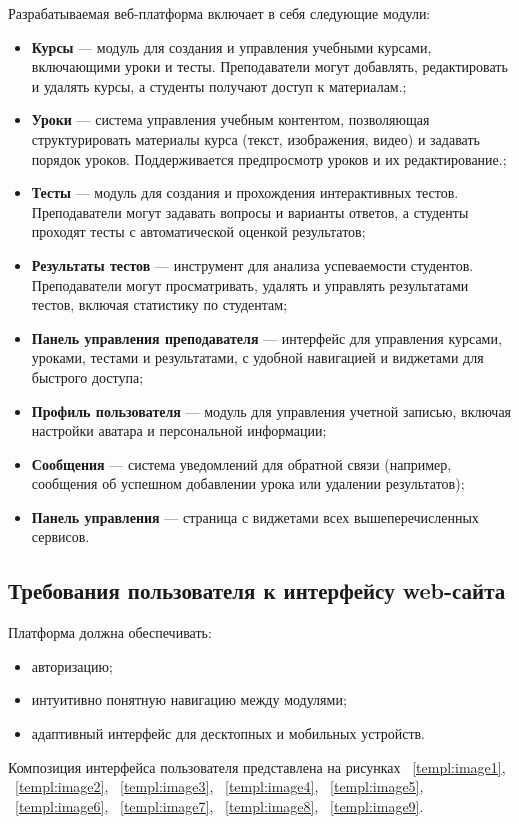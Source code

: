 Разрабатываемая веб-платформа включает в себя следующие модули:
\begin{itemize}
\item \textbf{Курсы} — модуль для создания и управления учебными курсами, включающими уроки и тесты. Преподаватели могут добавлять, редактировать и удалять курсы, а студенты получают доступ к материалам.;
\item \textbf{Уроки} — система управления учебным контентом, позволяющая структурировать материалы курса (текст, изображения, видео) и задавать порядок уроков. Поддерживается предпросмотр уроков и их редактирование.;
\item \textbf{Тесты} — модуль для создания и прохождения интерактивных тестов. Преподаватели могут задавать вопросы и варианты ответов, а студенты проходят тесты с автоматической оценкой результатов;
\item \textbf{Результаты тестов} — инструмент для анализа успеваемости студентов. Преподаватели могут просматривать, удалять и управлять результатами тестов, включая статистику по студентам;
\item \textbf{Панель управления преподавателя} — интерфейс для управления курсами, уроками, тестами и результатами, с удобной навигацией и виджетами для быстрого доступа;
\item \textbf{Профиль пользователя} — модуль для управления учетной записью, включая настройки аватара и персональной информации;
\item \textbf{Сообщения} — система уведомлений для обратной связи (например, сообщения об успешном добавлении урока или удалении результатов);
\item \textbf{Панель управления} — страница с виджетами всех вышеперечисленных сервисов.
\end{itemize}

\subsection{Требования пользователя к интерфейсу web-сайта}

Платформа должна обеспечивать:
\begin{itemize}
    \item авторизацию;
    \item интуитивно понятную навигацию между модулями;
    \item адаптивный интерфейс для десктопных и мобильных устройств.
\end{itemize}

Композиция интерфейса пользователя представлена на рисунках ~\ref{templ:image1}, ~\ref{templ:image2}, ~\ref{templ:image3}, ~\ref{templ:image4}, ~\ref{templ:image5}, ~\ref{templ:image6}, ~\ref{templ:image7}, ~\ref{templ:image8}, ~\ref{templ:image9}.

